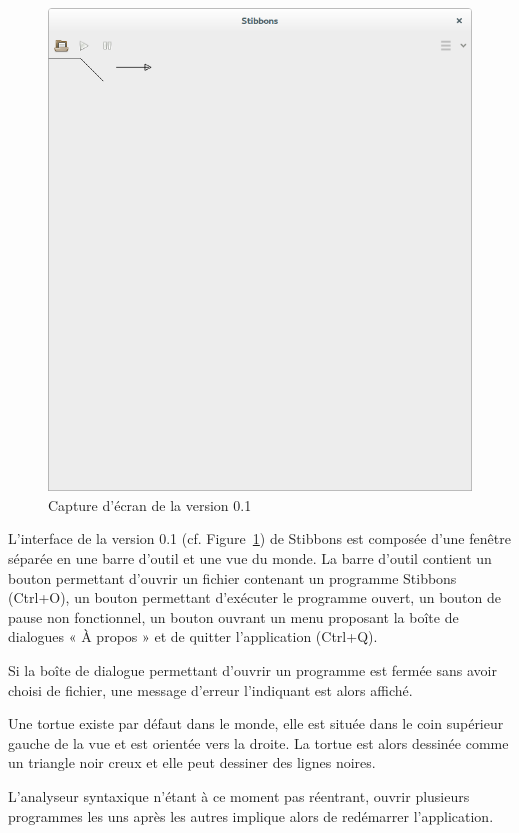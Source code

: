 \begin{figure}[h]
\includegraphics[scale=0.25]{doc/report/screenshot/stibbons-0-1-2.png}
\caption{\label{screenshot-0.1} Capture d'écran de la version 0.1}
\end{figure}

L'interface de la version 0.1 (cf. Figure~\ref{screenshot-0.1}) de Stibbons est composée d'une fenêtre séparée en une barre d'outil et une vue du monde.
La barre d'outil contient un bouton permettant d'ouvrir un fichier contenant un programme Stibbons (Ctrl+O), un bouton permettant d'exécuter le programme ouvert, un bouton de pause non fonctionnel, un bouton ouvrant un menu proposant la boîte de dialogues « À propos » et de quitter l'application (Ctrl+Q).

Si la boîte de dialogue permettant d'ouvrir un programme est fermée sans avoir choisi de fichier, une message d'erreur l'indiquant est alors affiché.

Une tortue existe par défaut dans le monde, elle est située dans le coin supérieur gauche de la vue et est orientée vers la droite. La tortue est alors dessinée comme un triangle noir creux et elle peut dessiner des lignes noires.

L'analyseur syntaxique n'étant à ce moment pas réentrant, ouvrir plusieurs programmes les uns après les autres implique alors de redémarrer l'application.

